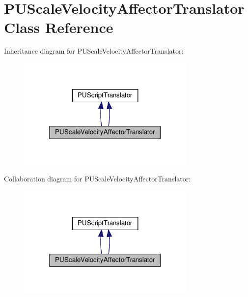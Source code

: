 \hypertarget{classPUScaleVelocityAffectorTranslator}{}\section{P\+U\+Scale\+Velocity\+Affector\+Translator Class Reference}
\label{classPUScaleVelocityAffectorTranslator}


Inheritance diagram for P\+U\+Scale\+Velocity\+Affector\+Translator\+:
\nopagebreak
\begin{figure}[H]
\begin{center}
\leavevmode
\includegraphics[width=249pt]{classPUScaleVelocityAffectorTranslator__inherit__graph}
\end{center}
\end{figure}


Collaboration diagram for P\+U\+Scale\+Velocity\+Affector\+Translator\+:
\nopagebreak
\begin{figure}[H]
\begin{center}
\leavevmode
\includegraphics[width=249pt]{classPUScaleVelocityAffectorTranslator__coll__graph}
\end{center}
\end{figure}
